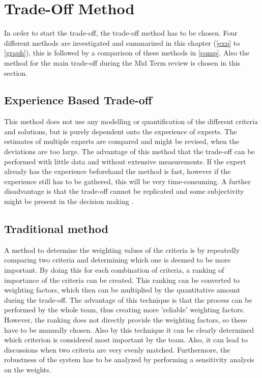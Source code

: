 \newpage
\chapter{Trade-Off Method}
\label{ch4-method}


In order to start the trade-off, the trade-off method has to be chosen. Four different methods are investigated and summarized in this chapter (\autoref{exp} to \autoref{graph}), this is followed by a comparison of these methods in \autoref{comp}. Also the method for the main trade-off during the Mid Term review is chosen in this section.

\section{Experience Based Trade-off}
\label{exp}
This method does not use any modelling or quantification of the different criteria and solutions, but is purely dependent onto the experience of experts. The estimates of multiple experts are compared and might be revised, when the deviations are too large. The advantage of this method that the trade-off can be performed with little data and without extensive measurements. If the expert already has the experience beforehand the method is fast, however if the experience still has to be gathered, this will be very time-consuming. A further disadvantage is that the trade-off cannot be replicated and some subjectivity might be present in the decision making \cite{tradeoff}.

\section{Traditional method}
A method to determine the weighting values of the criteria is by repeatedly comparing two criteria and determining which one is deemed to be more important. By doing this for each combination of criteria, a ranking of importance of the criteria can be created. This ranking can be converted to weighting factors, which then can be multiplied by the quantitative amount during the trade-off. The advantage of this technique is that the process can be performed by the whole team, thus creating more 'reliable' weighting factors. However, the ranking does not directly provide the weighting factors, so these have to be manually chosen. Also by this technique it can be clearly determined which criterion is considered most important by the team. Also, it can lead to discussions when two criteria are very evenly matched. Furthermore, the robustness of the system has to be analyzed by performing a sensitivity analysis on the weights. 

